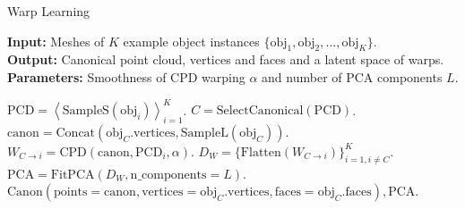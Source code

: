 \begin{algorithm}[H]

\caption{Warp Learning}\label{alg:warp_learn} 

\begin{flushleft}
    \hspace*{\algorithmicindent} \textbf{Input:} Meshes of $K$ example object instances $\{ \mathrm{obj}_1, \mathrm{obj}_2, ..., \mathrm{obj}_K \}$. \\
    \hspace*{\algorithmicindent} \textbf{Output:} Canonical point cloud, vertices and faces and a latent space of warps. \\
    \hspace*{\algorithmicindent} \textbf{Parameters:} Smoothness of CPD warping $\alpha$ and number of PCA components $L$.
\end{flushleft}

\begin{algorithmic}[1]

    \State $\mathrm{PCD} = \left< \mathrm{SampleS}(\mathrm{obj}_i) \right>_{i=1}^K$. 
    \State $C = \mathrm{SelectCanonical}(\mathrm{PCD})$. 
    \State $\mathrm{canon} = \mathrm{Concat}(\mathrm{obj}_C.\mathrm{vertices}, \mathrm{SampleL}(\mathrm{obj}_C))$. \Comment{\textcolor{blue}{Use both vertices and surface samples.}}
        \State $W_{C \rightarrow i} = \mathrm{CPD}(\mathrm{canon}, \mathrm{PCD}_i, \alpha)$. 
    \EndFor
    \State $D_W = \{ \mathrm{Flatten}(W_{C \rightarrow i}) \}_{i = 1, i \neq C}^K$. 
    \State $\mathrm{PCA} = \mathrm{FitPCA}(D_W, \mathrm{n\_components}=L)$. \Comment{\textcolor{blue}{Learn a latent space of canonical object warps.}}
    \State \Return $\mathrm{Canon}(\mathrm{points} = \mathrm{canon}, \mathrm{vertices} = \mathrm{obj}_C.\mathrm{vertices}, \mathrm{faces} = \mathrm{obj}_C.\mathrm{faces}), \mathrm{PCA}$.

\end{algorithmic}

\end{algorithm}